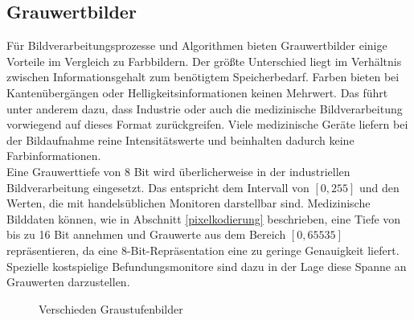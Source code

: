 \FloatBarrier
\subsection{Grauwertbilder} \label{grey_images}

Für Bildverarbeitungsprozesse und Algorithmen bieten Grauwertbilder einige Vorteile im Vergleich zu Farbbildern. Der größte Unterschied liegt im Verhältnis zwischen Informationsgehalt zum benötigtem Speicherbedarf. Farben bieten bei Kantenübergängen oder Helligkeitsinformationen keinen Mehrwert. Das führt unter anderem dazu, dass Industrie oder auch die medizinische Bildverarbeitung vorwiegend auf dieses Format zurückgreifen. Viele medizinische Geräte liefern bei der Bildaufnahme reine Intensitätswerte und beinhalten dadurch keine Farbinformationen.\\
Eine Grauwerttiefe von 8 Bit wird überlicherweise in der industriellen Bildverarbeitung eingesetzt. Das entspricht dem Intervall von $[0,255]$ und den Werten, die mit handelsüblichen Monitoren darstellbar sind. Medizinische Bilddaten können, wie in Abschnitt \ref{pixelkodierung} beschrieben, eine Tiefe von bis zu 16 Bit annehmen und Grauwerte aus dem Bereich $[0,65535]$ repräsentieren, da eine 8-Bit-Repräsentation eine zu geringe Genauigkeit liefert. Spezielle kostspielige Befundungsmonitore sind dazu in der Lage diese Spanne an Grauwerten darzustellen.

\begin{figure}[htb]
\centering
{}
\caption{Verschieden Graustufenbilder}
\label{grey}
\end{figure}

